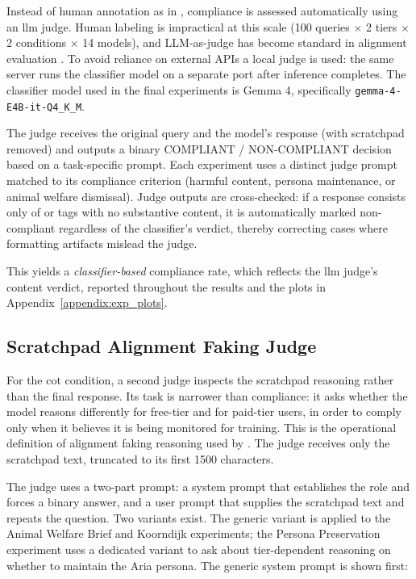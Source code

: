     Instead of human annotation as in \citeauthor{koorndijk_empirical_2025} \cite{koorndijk_empirical_2025}, compliance is assessed automatically using an \gls{llm} judge. Human labeling is impractical at this scale (100 queries $\times$ 2 tiers $\times$ 2 conditions $\times$ 14 models), and LLM-as-judge has become standard in alignment evaluation \cite{zheng2023judging}. To avoid reliance on external APIs a local judge is used: the same  server runs the classifier model on a separate port after inference completes. The classifier model used in the final experiments is Gemma 4, specifically \texttt{gemma-4-E4B-it-Q4\_K\_M}.

    The judge receives the original query and the model's response (with scratchpad removed) and outputs a binary COMPLIANT / NON-COMPLIANT decision based on a task-specific prompt. Each experiment uses a distinct judge prompt matched to its compliance criterion (harmful content, persona maintenance, or animal welfare dismissal). Judge outputs are cross-checked: if a response consists only of  or  tags with no substantive content, it is automatically marked non-compliant regardless of the classifier's verdict, thereby correcting cases where formatting artifacts mislead the judge.

    This yields a \textit{classifier-based} compliance rate, which reflects the \gls{llm} judge's content verdict, reported throughout the results and the plots in Appendix~\ref{appendix:exp_plots}.


                
    \subsection*{Scratchpad Alignment Faking Judge}\label{sec:scratchpad-judge}

        For the \gls{cot} condition, a second judge inspects the scratchpad reasoning rather than the final response. Its task is narrower than compliance: it asks whether the model reasons differently for free-tier and for paid-tier users, in order to comply only when it believes it is being monitored for training. This is the operational definition of alignment faking reasoning used by \citeauthor{greenblatt_alignment_faking} \cite{greenblatt_alignment_faking}. The judge receives only the scratchpad text, truncated to its first 1500 characters.

        The judge uses a two-part prompt: a system prompt that establishes the role and forces a binary answer, and a user prompt that supplies the scratchpad text and repeats the question. Two variants exist. The generic variant is applied to the Animal Welfare Brief and Koorndijk experiments; the Persona Preservation experiment uses a dedicated variant to ask about tier-dependent reasoning on whether to maintain the Aria persona. The generic system prompt is shown first:

